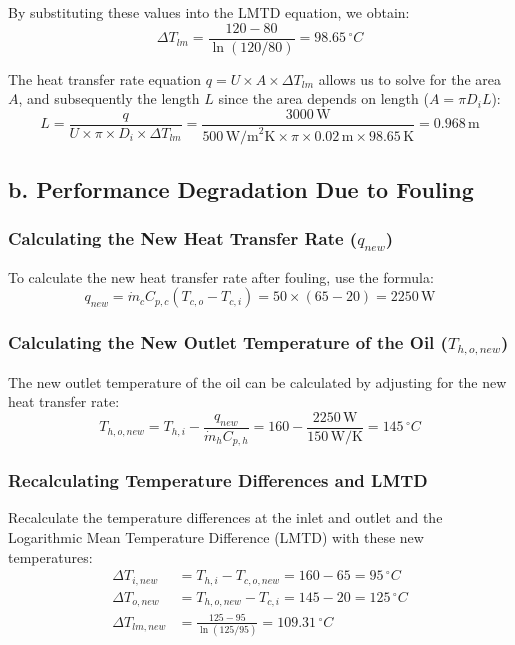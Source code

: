 \documentclass{article}
\numberwithin{equation}{section}
\begin{document}
By substituting these values into the LMTD equation, we obtain:
\begin{equation}
\Delta T_{lm} = \frac{120 - 80}{\ln(120/80)} = 98.65 \, ^{\circ}C
\end{equation}

The heat transfer rate equation \( q = U \times A \times \Delta T_{lm} \) allows us to solve for the area \( A \), and subsequently the length \( L \) since the area depends on length (\( A = \pi D_i L \)):
\begin{equation}
L = \frac{q}{U \times \pi \times D_{i} \times \Delta T_{lm}} = \frac{3000 \, \text{W}}{500 \, \text{W/m}^2\text{K} \times \pi \times 0.02 \, \text{m} \times 98.65 \, \text{K}} = 0.968 \, \text{m}
\end{equation}


\subsection*{b. Performance Degradation Due to Fouling}
\subsubsection*{Calculating the New Heat Transfer Rate (\(q_{new}\))}
To calculate the new heat transfer rate after fouling, use the formula:
\begin{equation}
q_{new} = \dot{m}_{c} C_{p,c} (T_{c,o} - T_{c,i}) = 50 \times (65 - 20) = 2250 \, \text{W}
\end{equation}

\subsubsection*{Calculating the New Outlet Temperature of the Oil (\(T_{h,o,new}\))}
The new outlet temperature of the oil can be calculated by adjusting for the new heat transfer rate:
\begin{equation}
T_{h,o,new} = T_{h,i} - \frac{q_{new}}{\dot{m}_{h} C_{p,h}} = 160 - \frac{2250 \, \text{W}}{150 \, \text{W/K}} = 145 \, ^{\circ}C
\end{equation}

\subsubsection*{Recalculating Temperature Differences and LMTD}
Recalculate the temperature differences at the inlet and outlet and the Logarithmic Mean Temperature Difference (LMTD) with these new temperatures:
\begin{align}
\Delta T_{i,new} &= T_{h,i} - T_{c,o,new} = 160 - 65 = 95 \, ^{\circ}C \\
\Delta T_{o,new} &= T_{h,o,new} - T_{c,i} = 145 - 20 = 125 \, ^{\circ}C \\
\Delta T_{lm,new} &= \frac{125 - 95}{\ln(125/95)} = 109.31 \, ^{\circ}C
\end{align}
\end{document}
